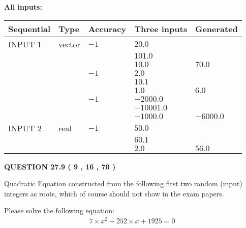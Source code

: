 \documentclass[12pt]{article}
\begin{document}
   
   
   
\noindent\vspace{0.1in}\hspace{-0.08in} {\textbf{\Large{All inputs: }}}
   
   
  
  
\noindent\begin{tabular}{|l|l|l|l|l|}
\hline
 Sequential & Type & Accuracy & Three inputs & Generated \\ 
\hline
 
 
  INPUT $            1 $ & vector & $           -1  $ & $
20.0
  $ & \\
  & & & $
101.0
  $ & \\
  & & & $
10.0
$ & $ 70.0 $ 
  \\
  & & $           -1  $ & $
2.0
  $ & \\
  & & & $
10.1
  $ & \\
  & & & $
1.0
$ & $ 6.0 $ 
  \\
  & & $           -1  $ & $
-2000.0
  $ & \\
  & & & $
-10001.0
  $ & \\
  & & & $
-1000.0
$ & $ -6000.0 $ 
 \\  \hline  
 
 
  INPUT $            2 $ & real & $           -1  $ & $
 50.0
  $ & \\
  & & &  $
 60.1
  $ & \\
  & & &  $
 2.0
 $ & $ 56.0 $ 
 \\  \hline  
 \end{tabular}
   
   
  
\vspace{0.2in}
  
{\textbf{\Large{QUESTION
27.9 
 (           9 ,          16 ,          70 )
}}}
  
  


\noindent{}
Quadratic Equation constructed from the following first two random (input) integers as roots,  
which of course should not show in the exam papers.  
\noindent{}


 
 

 
Please solve the following equation:
\begin{eqnarray*}
7 \times x^2  %
-252
                 \times x    %
+  %
1925 =0
\end{eqnarray*}
 
\end{document}
